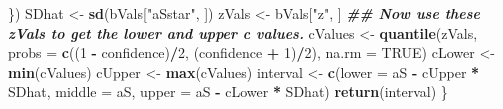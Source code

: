 \documentclass[
]{article}
\newenvironment{Shaded}{\begin{snugshade}}{\end{snugshade}}
\newcommand{\AttributeTok}[1]{\textcolor[rgb]{0.13,0.29,0.53}{#1}}
\newcommand{\ConstantTok}[1]{\textcolor[rgb]{0.56,0.35,0.01}{#1}}
\newcommand{\DecValTok}[1]{\textcolor[rgb]{0.00,0.00,0.81}{#1}}
\newcommand{\DocumentationTok}[1]{\textcolor[rgb]{0.56,0.35,0.01}{\textbf{\textit{#1}}}}
\newcommand{\FunctionTok}[1]{\textcolor[rgb]{0.13,0.29,0.53}{\textbf{#1}}}
\newcommand{\NormalTok}[1]{#1}
\newcommand{\OtherTok}[1]{\textcolor[rgb]{0.56,0.35,0.01}{#1}}
\newcommand{\SpecialCharTok}[1]{\textcolor[rgb]{0.81,0.36,0.00}{\textbf{#1}}}
\newcommand{\StringTok}[1]{\textcolor[rgb]{0.31,0.60,0.02}{#1}}
\begin{document}
\begin{Shaded}
\begin{Highlighting}[]
\NormalTok{  \})}
\NormalTok{  SDhat }\OtherTok{\textless{}{-}} \FunctionTok{sd}\NormalTok{(bVals[}\StringTok{"aSstar"}\NormalTok{, ])}
\NormalTok{  zVals }\OtherTok{\textless{}{-}}\NormalTok{ bVals[}\StringTok{"z"}\NormalTok{, ]}
  \DocumentationTok{\#\# Now use these zVals to get the lower and upper c values.}
\NormalTok{  cValues }\OtherTok{\textless{}{-}} \FunctionTok{quantile}\NormalTok{(zVals, }\AttributeTok{probs =} \FunctionTok{c}\NormalTok{((}\DecValTok{1} \SpecialCharTok{{-}}\NormalTok{ confidence)}\SpecialCharTok{/}\DecValTok{2}\NormalTok{, (confidence }\SpecialCharTok{+} 
                                                              \DecValTok{1}\NormalTok{)}\SpecialCharTok{/}\DecValTok{2}\NormalTok{), }\AttributeTok{na.rm =} \ConstantTok{TRUE}\NormalTok{)}
\NormalTok{  cLower }\OtherTok{\textless{}{-}} \FunctionTok{min}\NormalTok{(cValues)}
\NormalTok{  cUpper }\OtherTok{\textless{}{-}} \FunctionTok{max}\NormalTok{(cValues)}
\NormalTok{  interval }\OtherTok{\textless{}{-}} \FunctionTok{c}\NormalTok{(}\AttributeTok{lower =}\NormalTok{ aS }\SpecialCharTok{{-}}\NormalTok{ cUpper }\SpecialCharTok{*}\NormalTok{ SDhat, }\AttributeTok{middle =}\NormalTok{ aS, }\AttributeTok{upper =}\NormalTok{ aS }\SpecialCharTok{{-}} 
\NormalTok{                  cLower }\SpecialCharTok{*}\NormalTok{ SDhat)}
  \FunctionTok{return}\NormalTok{(interval)}
\NormalTok{\}}
\end{Highlighting}
\end{Shaded}
\end{document}
